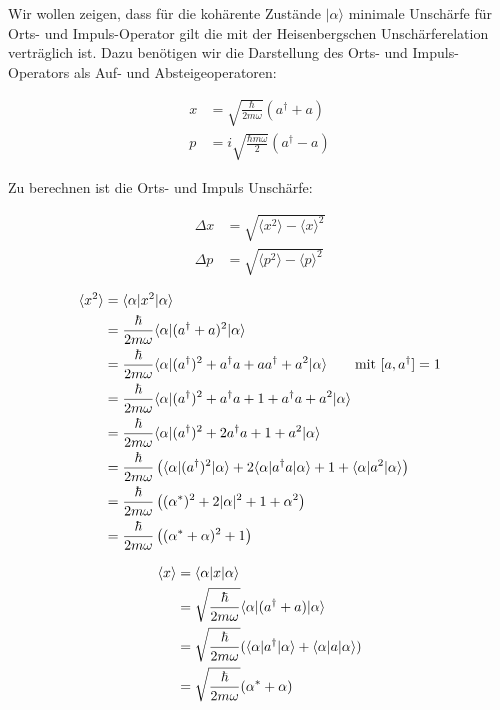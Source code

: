 Wir wollen zeigen, dass für die kohärente Zustände \(|\alpha\rangle \) minimale Unschärfe für Orts- und Impuls-Operator gilt die mit der Heisenbergschen Unschärferelation verträglich ist. Dazu benötigen wir die Darstellung des  Orts- und Impuls-Operators als Auf- und Absteigeoperatoren:

\begin{align}
  x &= \sqrt{ \frac{\hbar}{2m\omega}} (a^\dagger+a) \label{eq:11}\\
  p &= i\sqrt{ \frac{\hbar m\omega}{2}} (a^\dagger-a) \label{eq:12}
\end{align}

Zu berechnen ist die Orts- und Impuls Unschärfe:

\begin{align}
  \Delta x &= \sqrt{ \langle x^2\rangle -\langle x\rangle^2 }\label{eq:13}\\
   \Delta p &= \sqrt{ \langle p^2\rangle -\langle p\rangle^2 }\label{eq:14}
\end{align}


\begin{align}
  \label{eq:15}
  \langle x^2\rangle &= \langle \alpha|x^2|\alpha\rangle \notag\\
  &= \frac{\hbar}{2m\omega}\langle \alpha|(a^\dagger + a)^2|\alpha\rangle \notag\\
  &= \frac{\hbar}{2m\omega}\langle \alpha|(a^\dagger)^2 + a^\dagger a+aa^\dagger +a^2|\alpha\rangle \qquad \text{mit } [a,a^\dagger] = 1 \notag\\
   &= \frac{\hbar}{2m\omega}\langle \alpha|(a^\dagger)^2 + a^\dagger a+1+a^\dagger a +a^2|\alpha\rangle \notag\\
   &= \frac{\hbar}{2m\omega}\langle \alpha|(a^\dagger)^2 + 2 a^\dagger a+1 +a^2|\alpha\rangle\notag\\
   &= \frac{\hbar}{2m\omega}\left(\langle \alpha|(a^\dagger)^2|\alpha\rangle + 2\langle \alpha| a^\dagger a|\alpha\rangle+ 1 +\langle \alpha| a^2|\alpha\rangle\right)\notag \\
   &= \frac{\hbar}{2m\omega}\left((\alpha^*)^2 + 2| \alpha|^2 + 1 + \alpha^2\right) \notag\\
   &= \frac{\hbar}{2m\omega}\left((\alpha^*+\alpha)^2 + 1\right)
\end{align}

\begin{align}
  \label{eq:16}
   \langle x\rangle &= \langle \alpha|x|\alpha\rangle  \notag\\
 &= \sqrt{ \frac{\hbar}{2m\omega}}\langle \alpha|(a^\dagger + a)|\alpha\rangle \notag\\
 &= \sqrt{\frac{\hbar}{2m\omega}}(\langle \alpha|a^\dagger|\alpha\rangle +\langle \alpha| a|\alpha\rangle)\notag \\
 &= \sqrt{\frac{\hbar}{2m\omega}}(\alpha^* + \alpha)
\end{align}

